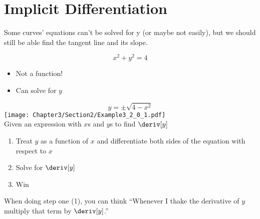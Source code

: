
\section{Implicit Differentiation}
Some curves' equations can't be solved for y (or maybe not easily), but we should still be able find the tangent line and its slope.
\begin{example}
    \begin{equation*}
        x^2 + y^2 = 4
    \end{equation*}
    \begin{itemize}
        \item Not a function!
        \item Can solve for $y$
    \end{itemize}
    \begin{equation*}
        y = \pm \sqrt{4 - x^2}
    \end{equation*}
    \texttt{[image: Chapter3/Section2/Example3\_2\_0\_1.pdf]}\\
    Given an expression with $x$s and $y$s to find $\deriv[y]$
    \begin{enumerate}
        \item Treat $y$ as a function of $x$ and differentiate both sides of the equation with respect to $x$
        \item Solve for $\deriv[y]$
        \item Win
    \end{enumerate}
\end{example}
\begin{note}
    When doing step one (1), you can think ``Whenever I thake the derivative of $y$ multiply that term by $\deriv[y]$.''
\end{note}
